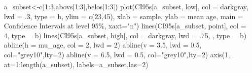 \documentclass[
  letterpaper,
  DIV=11,
  numbers=noendperiod]{scrreprt}
\newenvironment{Shaded}{\begin{snugshade}}{\end{snugshade}}
\newcommand{\AttributeTok}[1]{\textcolor[rgb]{0.40,0.45,0.13}{#1}}
\newcommand{\DecValTok}[1]{\textcolor[rgb]{0.68,0.00,0.00}{#1}}
\newcommand{\FloatTok}[1]{\textcolor[rgb]{0.68,0.00,0.00}{#1}}
\newcommand{\FunctionTok}[1]{\textcolor[rgb]{0.28,0.35,0.67}{#1}}
\newcommand{\NormalTok}[1]{\textcolor[rgb]{0.00,0.23,0.31}{#1}}
\newcommand{\OtherTok}[1]{\textcolor[rgb]{0.00,0.23,0.31}{#1}}
\newcommand{\SpecialCharTok}[1]{\textcolor[rgb]{0.37,0.37,0.37}{#1}}
\newcommand{\StringTok}[1]{\textcolor[rgb]{0.13,0.47,0.30}{#1}}
\begin{document}
\begin{Shaded}
\begin{Highlighting}[]
\NormalTok{a\_subset}\OtherTok{\textless{}{-}}\FunctionTok{c}\NormalTok{(}\DecValTok{1}\SpecialCharTok{:}\DecValTok{3}\NormalTok{,abovs[}\DecValTok{1}\SpecialCharTok{:}\DecValTok{3}\NormalTok{],belos[}\DecValTok{1}\SpecialCharTok{:}\DecValTok{3}\NormalTok{])}
\FunctionTok{plot}\NormalTok{(CI95s[a\_subset, }\StringTok{\textquotesingle{}low\textquotesingle{}}\NormalTok{], }\AttributeTok{col =} \StringTok{\textquotesingle{}darkgray\textquotesingle{}}\NormalTok{, }\AttributeTok{lwd =}\NormalTok{ .}\DecValTok{3}\NormalTok{, }
     \AttributeTok{type =} \StringTok{\textquotesingle{}b\textquotesingle{}}\NormalTok{, }\AttributeTok{ylim =} \FunctionTok{c}\NormalTok{(}\DecValTok{23}\NormalTok{,}\DecValTok{45}\NormalTok{), }
     \AttributeTok{xlab =} \StringTok{\textquotesingle{}sample\textquotesingle{}}\NormalTok{, }\AttributeTok{ylab =} \StringTok{\textquotesingle{}mean age\textquotesingle{}}\NormalTok{,}
     \AttributeTok{main =} \StringTok{\textquotesingle{}Confidence Intervals at level 95\%\textquotesingle{}}\NormalTok{,}
     \AttributeTok{xaxt=}\StringTok{"n"}\NormalTok{)}
\FunctionTok{lines}\NormalTok{(CI95s[a\_subset, }\StringTok{\textquotesingle{}point\textquotesingle{}}\NormalTok{], }\AttributeTok{col =} \DecValTok{4}\NormalTok{, }\AttributeTok{type =} \StringTok{\textquotesingle{}b\textquotesingle{}}\NormalTok{)}
\FunctionTok{lines}\NormalTok{(CI95s[a\_subset, }\StringTok{\textquotesingle{}high\textquotesingle{}}\NormalTok{], }\AttributeTok{col =} \StringTok{\textquotesingle{}darkgray\textquotesingle{}}\NormalTok{, }\AttributeTok{lwd =}\NormalTok{ .}\DecValTok{75}\NormalTok{, , }\AttributeTok{type =} \StringTok{\textquotesingle{}b\textquotesingle{}}\NormalTok{)}
\FunctionTok{abline}\NormalTok{(}\AttributeTok{h =}\NormalTok{ mu\_age, }\AttributeTok{col =} \DecValTok{2}\NormalTok{, }\AttributeTok{lwd =} \DecValTok{2}\NormalTok{)}
\FunctionTok{abline}\NormalTok{(}\AttributeTok{v =} \FloatTok{3.5}\NormalTok{, }\AttributeTok{lwd =} \FloatTok{0.5}\NormalTok{, }\AttributeTok{col=}\StringTok{"grey10"}\NormalTok{,}\AttributeTok{lty=}\DecValTok{2}\NormalTok{)}
\FunctionTok{abline}\NormalTok{(}\AttributeTok{v =} \FloatTok{6.5}\NormalTok{, }\AttributeTok{lwd =} \FloatTok{0.5}\NormalTok{, }\AttributeTok{col=}\StringTok{"grey10"}\NormalTok{,}\AttributeTok{lty=}\DecValTok{2}\NormalTok{)}
\FunctionTok{axis}\NormalTok{(}\DecValTok{1}\NormalTok{, }\AttributeTok{at=}\DecValTok{1}\SpecialCharTok{:}\FunctionTok{length}\NormalTok{(a\_subset), }\AttributeTok{labels=}\NormalTok{a\_subset,}\AttributeTok{las=}\DecValTok{2}\NormalTok{)}
\end{Highlighting}
\end{Shaded}
\end{document}
